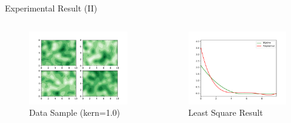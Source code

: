 \documentclass[
  ignorenonframetext,
  aspectratio=169,
  serif,onlymath]{beamer}
\begin{document}
\begin{frame}{Experimental Result (II)}
\protect\hypertarget{experimental-result-ii}{}

\begin{columns}

\begin{figure}
\centering
\includegraphics{ellipsoid.files/iso100.pdf}
\caption{Data Sample (kern=1.0)}
\end{figure}


\begin{figure}
\centering
\includegraphics{ellipsoid.files/result100.pdf}
\caption{Least Square Result}
\end{figure}

\end{columns}

\end{frame}
\end{document}
